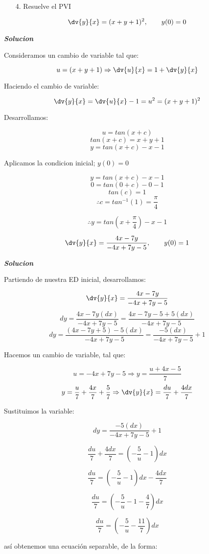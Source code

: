 \begin{enumerate}
    \item[4.] Resuelve el PVI
\end{enumerate}
\begin{align*}
    \dv{y}{x} = (x+y+1)^{2}, \qquad y(0)=0
\end{align*}

\textit{ \textbf{Solucion}}

Consideramos un cambio de variable tal que:

$$u=(x+y+1) \Rightarrow \dv{u}{x}=1+\dv{y}{x}$$

Haciendo el cambio de variable:

$$\dv{y}{x} = \dv{u}{x} -1 =u^{2}=(x+y+1)^{2}$$

Desarrollamos:

$$u=tan(x+c)$$
$$tan(x+c)=x+y+1$$
$$y=tan(x+c)-x-1$$

Aplicamos la condicion inicial; $y(0)=0$

$$y=tan(x+c)-x-1$$
$$0=tan(0+c)-0-1$$
$$tan(c)=1$$
$$\therefore c=tan^{-1}(1)=\frac{\pi}{4}$$

$$\therefore y=tan(x+\frac{\pi}{4})-x-1$$

\begin{align*}
    \dv{y}{x} = \frac{4x-7y}{-4x+7y-5}, \qquad y(0)=1
\end{align*}

\textit{ \textbf{Solucion}}

Partiendo de nuestra ED inicial, desarrollamos:

$$\dv{y}{x} = \frac{4x-7y}{-4x+7y-5}$$
$$dy= \frac{4x-7y (dx) }{-4x+7y-5}= \frac{4x-7y-5+5 (dx) }{-4x+7y-5}$$
$$dy=\frac{(4x-7y+5)-5 (dx) }{-4x+7y-5}=\frac{-5 (dx) }{-4x+7y-5} +1$$

Hacemos un cambio de variable, tal que:

$$u=-4x+7y-5 \Rightarrow y=\frac{u+4x-5}{7} $$
$$y=\frac{u}{7}+\frac{4x}{7}+\frac{5}{7} \Rightarrow \dv{y}{x}=\frac{du}{7}+\frac{4dx}{7} $$

Sustituimos la variable:

$$dy=\frac{-5 (dx) }{-4x+7y-5} +1$$

$$\frac{du}{7}+\frac{4dx}{7}=(-\frac{5}{u}-1)dx$$

$$\frac{du}{7}=(-\frac{5}{u}-1)dx-\frac{4dx}{7}$$

$$\frac{du}{7}=(-\frac{5}{u}-1-\frac{4}{7})dx$$

$$\frac{du}{7}=(-\frac{5}{u}-\frac{11}{7})dx$$

así obtenemos una ecuación separable, de la forma:

